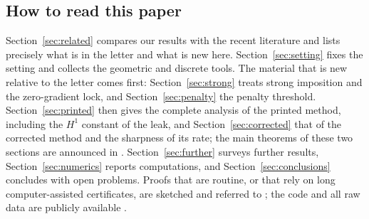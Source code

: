 \subsection{How to read this paper}
Section~\ref{sec:related} compares our results with the recent literature and lists precisely what is in the letter \cite{CavalcantePadhiLetter} and what is new here. Section~\ref{sec:setting} fixes the setting and collects the geometric and discrete tools. The material that is new relative to the letter comes first: Section~\ref{sec:strong} treats strong imposition and the zero-gradient lock, and Section~\ref{sec:penalty} the penalty threshold. Section~\ref{sec:printed} then gives the complete analysis of the printed method, including the $H^1$ constant of the leak, and Section~\ref{sec:corrected} that of the corrected method and the sharpness of its rate; the main theorems of these two sections are announced in \cite{CavalcantePadhiLetter}. Section~\ref{sec:further} surveys further results, Section~\ref{sec:numerics} reports computations, and Section~\ref{sec:conclusions} concludes with open problems. Proofs that are routine, or that rely on long computer-assisted certificates, are sketched and referred to \cite{PadhiExt}; the code and all raw data are publicly available \cite{ZeroGradRepo}.
